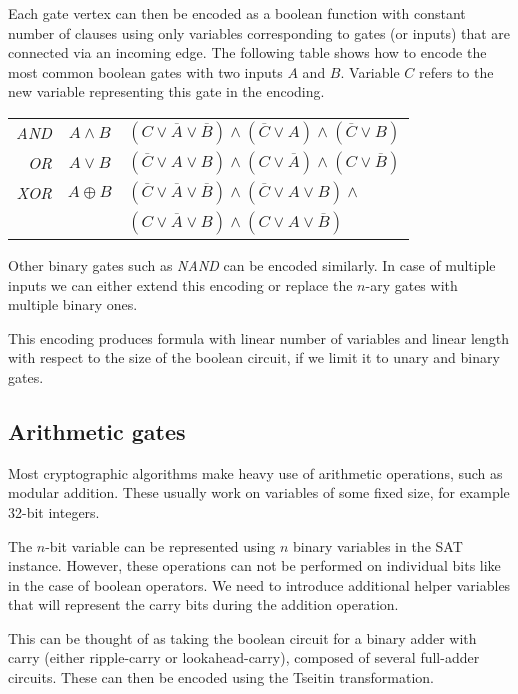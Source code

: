 Each gate vertex can then be encoded as a boolean function with constant number of clauses using only variables corresponding to gates (or inputs) that are connected via an incoming edge.
The following table shows how to encode the most common boolean gates with two inputs $A$ and $B$.
Variable $C$ refers to the new variable representing this gate in the encoding.

\begin{tabular}{r c l}
\emph{AND}& $A\land B$ & $(C \lor \overline{A} \lor \overline{B}) \land (\overline{C} \lor A) \land (\overline{C} \lor B)$ \\
\emph{OR} & $A\lor B$ & $(\overline{C} \lor A \lor B) \land (C \lor \overline{A}) \land (C \lor \overline{B})$ \\
\emph{XOR} & $A\oplus B$ & $(\overline{C} \lor \overline{A} \lor \overline{B}) \land (\overline{C} \lor A \lor B) \land$\\
& & $(C \lor \overline{A} \lor B) \land (C \lor A \lor \overline{B})$
\end{tabular}

Other binary gates such as \emph{NAND} can be encoded similarly.
In case of multiple inputs we can either extend this encoding or replace the $n$-ary gates with multiple binary ones.

This encoding produces formula with linear number of variables and linear length with respect to the size of the boolean circuit, if we limit it to unary and binary gates.

\subsection{Arithmetic gates}
Most cryptographic algorithms make heavy use of arithmetic operations, such as modular addition.
These usually work on variables of some fixed size, for example 32-bit integers.

The $n$-bit variable can be represented using $n$ binary variables in the SAT instance.
However, these operations can not be performed on individual bits like in the case of boolean operators.
We need to introduce additional helper variables that will represent the carry bits during the addition operation.

This can be thought of as taking the boolean circuit for a binary adder with carry (either ripple-carry or lookahead-carry), composed of several full-adder circuits.
These can then be encoded using the Tseitin transformation.

